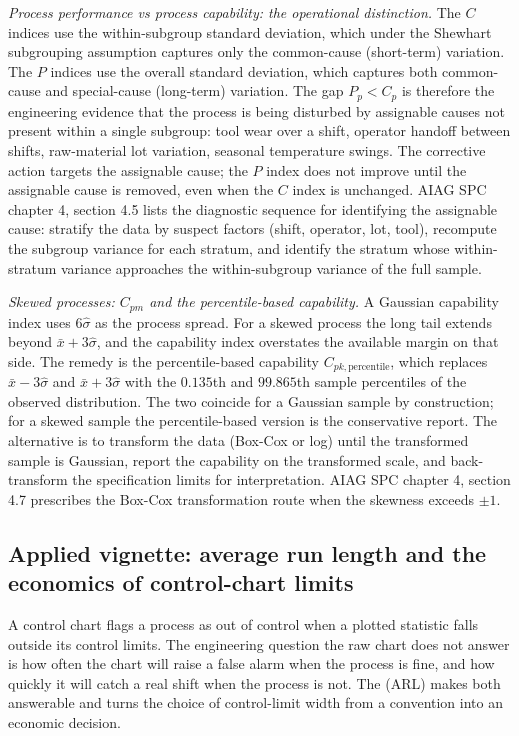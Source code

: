 \textit{Process performance vs process capability: the
operational distinction.} The $C$ indices use the within-subgroup
standard deviation, which under the Shewhart subgrouping
assumption captures only the common-cause (short-term) variation.
The $P$ indices use the overall standard deviation, which
captures both common-cause and special-cause (long-term)
variation. The gap $P_{p} < C_{p}$ is therefore the engineering
evidence that the process is being disturbed by assignable causes
not present within a single subgroup: tool wear over a shift,
operator handoff between shifts, raw-material lot variation,
seasonal temperature swings. The corrective action targets the
assignable cause; the $P$ index does not improve until the
assignable cause is removed, even when the $C$ index is
unchanged. AIAG SPC chapter 4, section 4.5 lists the diagnostic
sequence for identifying the assignable cause: stratify the data
by suspect factors (shift, operator, lot, tool), recompute the
subgroup variance for each stratum, and identify the stratum
whose within-stratum variance approaches the within-subgroup
variance of the full sample.

\textit{Skewed processes: $C_{pm}$ and the percentile-based
capability.} A Gaussian capability index uses $6 \hat\sigma$ as
the process spread. For a skewed process the long tail extends
beyond $\bar{x} + 3 \hat\sigma$, and the capability index
overstates the available margin on that side. The remedy is the
percentile-based capability $C_{pk, \text{percentile}}$, which
replaces $\bar{x} - 3 \hat\sigma$ and $\bar{x} + 3 \hat\sigma$
with the $0.135$th and $99.865$th sample percentiles of the
observed distribution. The two coincide for a Gaussian sample by
construction; for a skewed sample the percentile-based version is
the conservative report. The alternative is to transform the
data (Box-Cox or log) until the transformed sample is Gaussian,
report the capability on the transformed scale, and back-transform
the specification limits for interpretation. AIAG SPC chapter 4,
section 4.7 prescribes the Box-Cox transformation route when the
skewness exceeds $\pm 1$.

\subsection{Applied vignette: average run length and the economics
of control-chart limits}

A control chart flags a process as out of control when a plotted
statistic falls outside its control limits. The engineering
question the raw chart does not answer is how often the chart will
raise a false alarm when the process is fine, and how quickly it
will catch a real shift when the process is not. The
 (ARL) makes both answerable and turns
the choice of control-limit width from a convention into an
economic decision.

